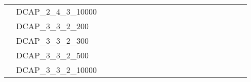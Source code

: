 \begin{table}[]
{\begin{tabular}{|c|l|lll|lll|lllll|llll|lll|}
			& DCAP\_2\_4\_3\_10000          &                          &                         &                          &                          &                         &                          &                          &                         &                         &                          &                           &                             &                             &                             &                               &                          &                          &                           \\
			& DCAP\_3\_3\_2\_200            &                          &                         &                          &                          &                         &                          &                          &                         &                         &                          &                           &                             &                             &                             &                               &                          &                          &                           \\
			& DCAP\_3\_3\_2\_300            &                          &                         &                          &                          &                         &                          &                          &                         &                         &                          &                           &                             &                             &                             &                               &                          &                          &                           \\
			& DCAP\_3\_3\_2\_500            &                          &                         &                          &                          &                         &                          &                          &                         &                         &                          &                           &                             &                             &                             &                               &                          &                          &                           \\
			& DCAP\_3\_3\_2\_10000          &                          &                         &                          &                          &                         &                          &                          &                         &                         &                          &                           &                             &                             &                             &                               &                          &                          &                           \\

\end{tabular}}
\end{table}
